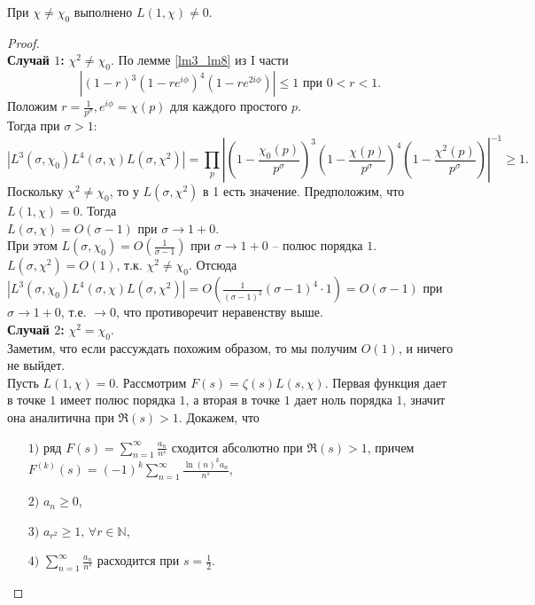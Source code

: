 \begin{lemma} \label{l7_lm7}
	При $\chi \ne \chi_0$ выполнено $L(1, \chi) \ne 0$.
\end{lemma}
\begin{proof}~\\
	\textbf{Случай $1$:} $\chi^2 \ne \chi_0$.
	По лемме \ref{lm3_lm8} из I части 
	$$|(1 - r)^3 (1 - re^{i \phi})^4 (1 - re^{2i\phi})| \leq 1 \text{ при } 0 < r < 1.$$
	Положим $\displaystyle r = \frac{1}{p^{\sigma}}, e^{i \phi} = \chi(p)$ для каждого простого $p$.\\
	Тогда при $\sigma > 1$:
	$$|L^3(\sigma, \chi_0) L^4(\sigma, \chi) L (\sigma, \chi^2)| = \prod_p \left|\left(1 - \frac{\chi_0(p)}{p^{\sigma}}\right)^3\left(1 - \frac{\chi(p)}{p^{\sigma}}\right)^4\left(1 - \frac{\chi^2(p)}{p^{\sigma}}\right) \right|^{-1} \geq 1.$$
	Поскольку $\chi^2 \ne \chi_0$, то у $L(\sigma, \chi^2)$ в 1 есть значение. Предположим, что $L(1, \chi) = 0$. Тогда\\ 
	$L(\sigma, \chi) = O(\sigma - 1)$ при $\sigma \rightarrow 1+0$.\\
	При этом $\displaystyle L(\sigma, \chi_0) = O(\frac{1}{\sigma - 1})$ при $\sigma \rightarrow 1+0$ -- полюс порядка $1$.\\
	$L(\sigma, \chi^2) = O(1)$, т.к. $\chi^2 \ne \chi_0$.
	Отсюда $\displaystyle |L^3(\sigma, \chi_0) L^4(\sigma, \chi) L(\sigma, \chi^2)| = O(\frac{1}{(\sigma - 1)^3} (\sigma - 1)^4 \cdot 1) = O(\sigma - 1)$ при $\sigma \rightarrow 1+0$, т.е. $\rightarrow 0$, что противоречит неравенству выше.\\
	\textbf{Случай $2$:} $\chi^2 = \chi_0$.\\
	Заметим, что если рассуждать похожим образом, то мы получим $O(1)$, и ничего не выйдет.\\
	Пусть $L(1, \chi) = 0$. Рассмотрим $F(s) = \zeta(s) L(s, \chi)$. Первая функция дает в точке $1$ имеет полюс порядка $1$, а вторая в точке $1$ дает ноль порядка $1$, значит она аналитична при $\Re(s) > 1$.
	Докажем, что 
	\begin{itemize}
		\item[$1)$] ряд $\displaystyle F(s) = \sum\limits_{n=1}^\infty \frac{a_n}{n^s}$ сходится абсолютно при $\Re(s) > 1$, причем $\displaystyle F^{(k)}(s) = (-1)^k \sum_{n = 1}^{\infty} \frac{\ln(n)^k a_n}{n^s}$,
		\item[$2)$] $a_n \geq 0$,
		\item[$3)$] $a_{r^2} \geq 1, \, \forall r \in \mathbb{N}$,
		\item[$4)$] $\displaystyle \sum\limits_{n=1}^\infty \frac{a_n}{n^s} $ расходится при $\displaystyle s = \frac{1}{2}$.

\end{itemize}
\end{proof}
